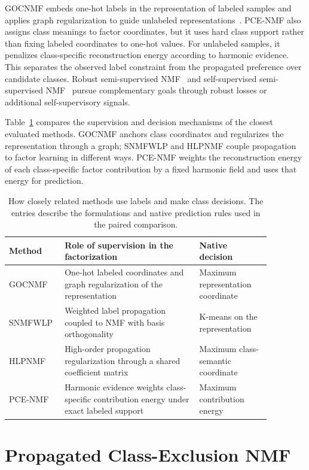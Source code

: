 \documentclass[preprint,12pt]{elsarticle}
\theoremstyle{remark}
\begin{document}
GOCNMF embeds one-hot labels in the representation of labeled samples
and applies graph regularization to guide unlabeled
representations~\cite{li2025gocnmf}. PCE-NMF also assigns class
meanings to factor coordinates, but it uses hard class support rather
than fixing labeled coordinates to one-hot values. For unlabeled
samples, it penalizes class-specific reconstruction energy according
to harmonic evidence. This separates the observed label constraint
from the propagated preference over candidate classes.
Robust semi-supervised NMF~\cite{peng2021robust} and self-supervised
semi-supervised NMF~\cite{chavoshinejad2023s4} pursue complementary
goals through robust losses or additional self-supervisory signals.

Table~\ref{tab:method_distinctions} compares the supervision and
decision mechanisms of the closest evaluated methods. GOCNMF anchors
class coordinates and regularizes the representation through a graph;
SNMFWLP and HLPNMF couple propagation to factor learning in different
ways. PCE-NMF weights the reconstruction energy of each class-specific
factor contribution by a fixed harmonic field and uses that energy
for prediction.

\begin{table}[!htbp]
\centering
\caption{How closely related methods use labels and make class decisions.
The entries describe the formulations and native prediction rules used
in the paired comparison.}
\label{tab:method_distinctions}
\small
\begin{tabular}{p{0.15\linewidth}p{0.47\linewidth}p{0.25\linewidth}}
\toprule
Method & Role of supervision in the factorization & Native decision \\
\midrule
GOCNMF & One-hot labeled coordinates and graph regularization of the representation & Maximum representation coordinate \\
SNMFWLP & Weighted label propagation coupled to NMF with basis orthogonality & K-means on the representation \\
HLPNMF & High-order propagation regularization through a shared coefficient matrix & Maximum class-semantic coordinate \\
PCE-NMF & Harmonic evidence weights class-specific contribution energy under exact labeled support & Maximum contribution energy \\
\bottomrule
\end{tabular}
\end{table}

\section{Propagated Class-Exclusion NMF}
\label{sec:method}
\end{document}
